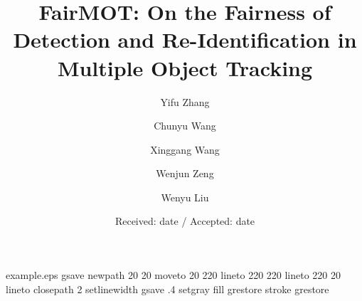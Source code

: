 




\begin{filecontents*}{example.eps}
gsave
newpath
  20 20 moveto
  20 220 lineto
  220 220 lineto
  220 20 lineto
closepath
2 setlinewidth
gsave
  .4 setgray fill
grestore
stroke
grestore
\end{filecontents*}
\RequirePackage{fix-cm}
\documentclass[twocolumn]{svjour3}          



\smartqed  \usepackage{graphicx}
\usepackage{times}
\usepackage{epsfig}
\usepackage{graphicx}
\usepackage{amsmath}
\usepackage{amssymb}
\usepackage{booktabs}
\usepackage{bm}
\usepackage{hyperref}
\usepackage{multirow}
\usepackage{multicol}
\usepackage{float}
\usepackage{stfloats}
\usepackage{subfiles}
\newcommand{\etal}{\textit{et al}. }
\newcommand{\ie}{\textit{i}.\textit{e}. }
\newcommand{\eg}{\textit{e}.\textit{g}.}
\hypersetup{
    colorlinks=true,
    linkcolor=blue,
    filecolor=magenta,      
    urlcolor=magenta,
    citecolor=blue,
}
\usepackage{natbib} 






\title{FairMOT: On the Fairness of Detection and Re-Identification in Multiple Object Tracking }




\author{Yifu Zhang \and 
Chunyu Wang \and 
Xinggang Wang \and 
Wenjun Zeng \and 
Wenyu Liu 
}



\date{Received: date / Accepted: date}



